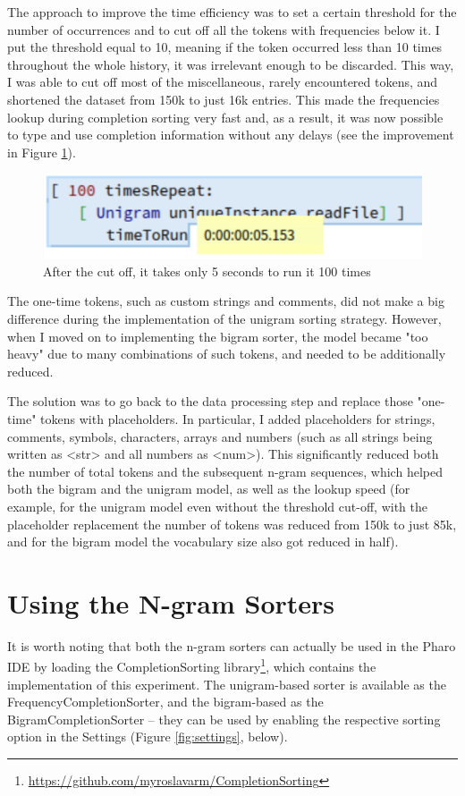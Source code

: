 The approach to improve the time efficiency was to set a certain threshold for the number of occurrences and to cut off all the tokens with frequencies below it. I put the threshold equal to 10, meaning if the token occurred less than 10 times throughout the whole history, it was irrelevant enough to be discarded. This way, I was able to cut off most of the miscellaneous, rarely encountered tokens, and shortened the dataset from 150k to just 16k entries. This made the frequencies lookup during completion sorting very fast and, as a result, it was now possible to type and use completion information without any delays (see the improvement in Figure \ref{fig:sorterFast}).

\begin{figure}[H]
    \centering
    \includegraphics[width=0.7\linewidth]{images/unigramTimeToRunFast.png}
    \caption{After the cut off, it takes only 5 seconds to run it 100 times}
    \label{fig:sorterFast}
\end{figure}

The one-time tokens, such as custom strings and comments, did not make a big difference during the implementation of the unigram sorting strategy. However, when I moved on to implementing the bigram sorter, the model became "too heavy" due to many combinations of such tokens, and needed to be additionally reduced.

The solution was to go back to the data processing step and replace those "one-time" tokens with placeholders. In particular, I added placeholders for strings, comments, symbols, characters, arrays and numbers (such as all strings being written as <str> and all numbers as <num>). This significantly reduced both the number of total tokens and the subsequent n-gram sequences, which helped both the bigram and the unigram model, as well as the lookup speed (for example, for the unigram model even without the threshold cut-off, with the placeholder replacement the number of tokens was reduced from 150k to just 85k, and for the bigram model the vocabulary size also got reduced in half).

\section{Using the N-gram Sorters}
\label{sec:ProposedSolution-Usage}
It is worth noting that both the n-gram sorters can actually be used in the Pharo IDE by loading the CompletionSorting library\footnote{\url{https://github.com/myroslavarm/CompletionSorting}}, which contains the implementation of this experiment. The unigram-based sorter is available as the FrequencyCompletionSorter, and the bigram-based as the BigramCompletionSorter -- they can be used by enabling the respective sorting option in the Settings (Figure \ref{fig:settings}, below).

